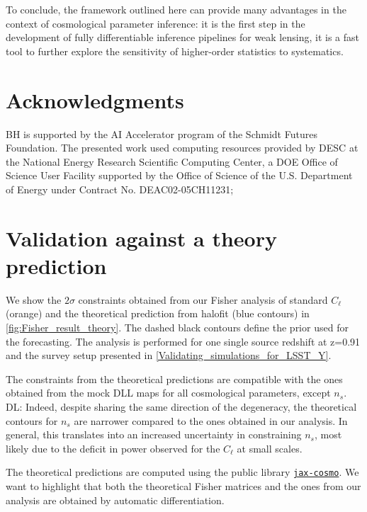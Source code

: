 \documentclass[twocolumn,twocolappendix]{aastex63}
\newcommand{\denise}[1]{{\color{red}DL: #1}}
\begin{document}
To conclude, the framework outlined here can provide many advantages in the context of cosmological parameter inference:  it is the first step in the development of fully differentiable inference pipelines for weak lensing, it is a fast tool to further explore the sensitivity of higher-order statistics to systematics. 


\section*{Acknowledgments}
BH is supported by the AI Accelerator program of the Schmidt Futures Foundation. The presented work used computing resources provided by DESC at the National Energy Research Scientific Computing Center, a DOE Office of Science User Facility supported by the Office of Science of the U.S. Department of Energy under Contract No. DEAC02-05CH11231;

\appendix


\section{Validation against a theory prediction}
We show the $2\sigma$ constraints obtained from our Fisher analysis of standard $C_{\ell}$ (orange) and the theoretical prediction from halofit (blue contours) in \autoref{fig:Fisher_result_theory}. The dashed black contours define the prior used for the forecasting.
The analysis is performed for one single source redshift at z=0.91 and the survey setup presented in \autoref{Validating_simulations_for_LSST_Y}.

The constraints from the theoretical predictions
are compatible with the ones obtained from the mock DLL maps for all cosmological parameters, except $n_s$. \denise{Indeed, despite sharing the same direction of the degeneracy, the theoretical contours for $n_s$ are narrower compared to the ones obtained in our analysis. In general, this translates into an increased uncertainty in constraining $n_s$, most likely due to the deficit in power observed for the $C_{\ell}$ at small scales. }

The theoretical predictions are computed using the public library  \href{https://github.com/DifferentiableUniverseInitiative/jax_cosmo}{\texttt{jax-cosmo}}. 
We want to highlight that both the theoretical Fisher matrices and the ones from our analysis are obtained by automatic differentiation.
\end{document}
